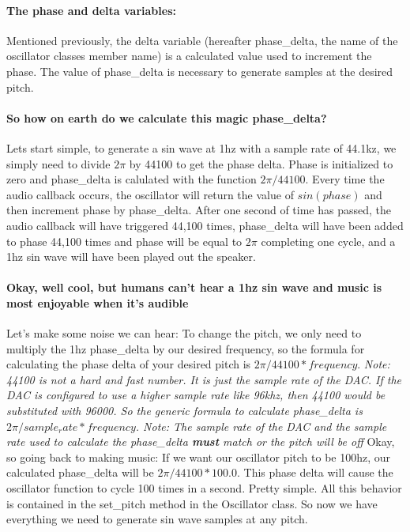 \documentclass[acmlarge,screen]{acmart}
\begin{document}
	\paragraph{The phase and delta variables:} Mentioned previously, the delta variable (hereafter phase\_delta, the name of the oscillator classes member name) is a calculated value used to increment the phase. The value of phase\_delta is necessary to generate samples at the desired pitch.
	\paragraph{So how on earth do we calculate this magic phase\_delta?} Lets start simple, to generate a sin wave at 1hz with a sample rate of 44.1kz, we simply need to divide \( 2\pi \) by 44100 to get the phase delta. Phase is initialized to zero and phase\_delta is calulated with the function \( 2\pi/44100 \). Every time the audio callback occurs, the oscillator will return the value of \( sin(phase) \) and then increment phase by phase\_delta. After one second of time has passed, the audio callback will have triggered 44,100 times, phase\_delta will have been added to phase 44,100 times and phase will be equal to \( 2\pi \) completing one cycle, and a 1hz sin wave will have been played out the speaker. 
	
	\paragraph{Okay, well cool, but humans can't hear a 1hz sin wave and music is most enjoyable when it's audible} Let's make some noise we can hear: To change the pitch, we only need to multiply the 1hz phase\_delta by our desired frequency, so the formula for calculating the phase delta of your desired pitch is \( 2\pi/44100 * frequency \). \textit{Note: 44100 is not a hard and fast number. It is just the sample rate of the DAC. If the DAC is configured to use a higher sample rate like 96khz, then 44100 would be substituted with 96000. So the generic formula to calculate phase\_delta is \( 2\pi/sample_rate * frequency \). Note: The sample rate of the DAC and the sample rate used to calculate the phase\_delta \textbf{must} match or the pitch will be off} Okay, so going back to making music: If we want our oscillator pitch to be 100hz, our calculated phase\_delta will be \( 2\pi/44100 * 100.0\). This phase delta will cause the oscillator function to cycle 100 times in a second. Pretty simple. All this behavior is contained in the set\_pitch method in the Oscillator class. So now we have everything we need to generate sin wave samples at any pitch.
	
\end{document}

